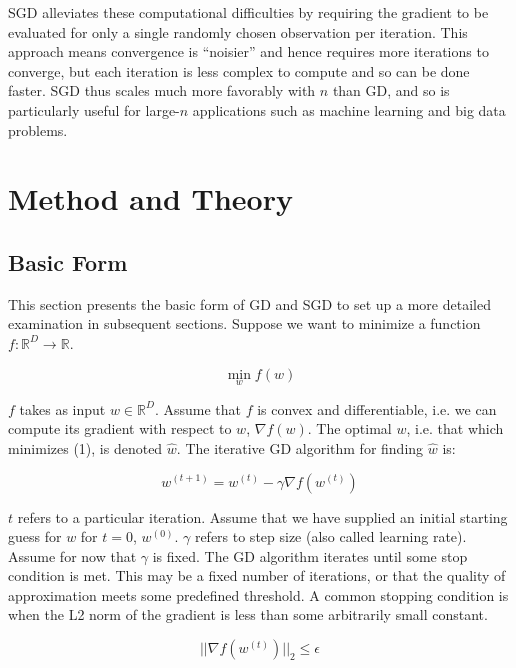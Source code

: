 \documentclass{article}
\begin{document}
SGD alleviates these computational difficulties by requiring the gradient to be
evaluated for only a single randomly chosen observation per iteration. This
approach means convergence is ``noisier'' and hence requires more iterations to
converge, but each iteration is less complex to compute and so can be done
faster. SGD thus scales much more favorably with $n$ than GD, and so is
particularly useful for large-$n$ applications such as machine learning
and big data problems.

\section{Method and Theory}

\subsection{Basic Form}

This section presents the basic form of GD and SGD to set up a more detailed
examination in subsequent sections. Suppose we want to minimize a function $f: \mathbb{R}^D \to \mathbb{R}$. 

\begin{equation}
	\min_w f(w)
\end{equation}

$f$ takes as input $w \in \mathbb{R}^D$. Assume
that $f$ is convex and differentiable, i.e. we can compute its gradient with
respect to $w$, $\nabla f(w)$. The optimal $w$, i.e. that which minimizes (1),
is denoted $\hat{w}$. The iterative GD algorithm for finding $\hat{w}$ is:

\begin{equation}
	w^{(t+1)} = w^{(t)} - \gamma \nabla f(w^{(t)})
\end{equation}

$t$ refers to a particular iteration. Assume that we have supplied an initial
starting guess for $w$ for $t=0$, $w^{(0)}$. $\gamma$ refers to step size (also called
learning rate). Assume for now that $\gamma$ is fixed. The GD algorithm iterates
until some stop condition is met. This may be a fixed number of iterations, or
that the quality of approximation meets some predefined threshold. 
A common stopping condition is when the L2 norm of the gradient
is less than some arbitrarily small constant. 

\begin{equation}
	||\nabla f(w^{(t)})||_2 \leq \epsilon
\end{equation}
\end{document}
